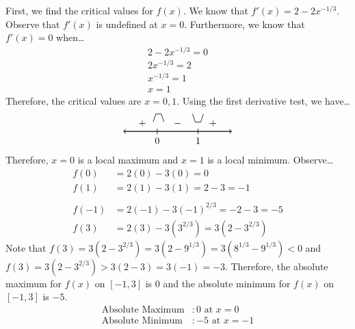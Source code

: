 \documentclass[12pt,letterpaper]{exam}
\begin{document}
\begin{questions}
\tsol First, we find the critical values for $f(x)$. We know that $f'(x)= 2 - 2x^{-1/3}$. Observe that $f'(x)$ is undefined at $x= 0$. Furthermore, we know that $f'(x)= 0$ when\dots
	\[
	\begin{gathered}
	2 - 2x^{-1/3}= 0 \\
	2x^{-1/3}= 2 \\
	x^{-1/3}= 1 \\
	x= 1
	\end{gathered}
	\]
Therefore, the critical values are $x= 0, 1$. Using the first derivative test, we have\dots
	\[
	\begin{tikzpicture}
	\draw[line width=0.03cm,<->] (-2,0) -- (2,0);
	\draw[line width=0.02cm] (-0.75,-0.1) -- (-0.75,0.1);
	\draw[line width=0.02cm] (0.75,-0.1) -- (0.75,0.1);
	\node at (-0.75,-0.35) {$0$};
	\node at (0.75,-0.35) {$1$};
	\node at (1.3,0.3) {$+$};
	\node at (0,0.3) {$-$};
	\node at (-1.3,0.3) {$+$};
	\draw[line width=0.02cm] (-0.9,0.35) -- (-0.8,0.65) -- (-0.6,0.65) -- (-0.5,0.35);
	\draw[line width=0.02cm] (0.55,0.65) -- (0.65,0.35) -- (0.85,0.35) -- (0.95,0.65);
	\end{tikzpicture}
	\]
Therefore, $x= 0$ is a local maximum and $x= 1$ is a local minimum. Observe\dots
	\[
	\begin{aligned}
	f(0)&= 2(0) - 3(0)= 0 \\[0.1cm]
	f(1)&= 2(1) - 3(1)= 2 - 3= -1 \\
	\\
	f(-1)&= 2(-1) - 3(-1)^{2/3}= -2 - 3= -5 \\[0.1cm]
	f(3)&= 2(3) - 3(3^{2/3})= 3(2 - 3^{2/3})
	\end{aligned}
	\] \pspace
Note that $f(3)= 3(2 - 3^{2/3})= 3(2 - 9^{1/3})= 3(8^{1/3} - 9^{1/3}) < 0$ and $f(3)= 3(2 - 3^{2/3}) > 3(2 - 3)= 3(-1)= -3$. Therefore, the absolute maximum for $f(x)$ on $[-1, 3]$ is $0$ and the absolute minimum for $f(x)$ on $[-1, 3]$ is $-5$. 
	\[
	\boxed{
	\begin{aligned}
	\text{Absolute Maximum} &\colon 0 \text{ at } x= 0 \\
	\text{Absolute Minimum} &\colon {-5} \text{ at } x= -1
	\end{aligned}
	}
	\]



\newpage
{} \par\vspace{0.3cm}


\end{questions}
\end{document}
